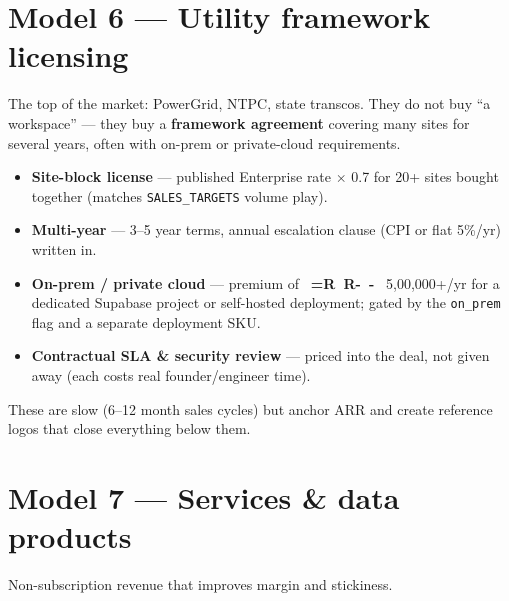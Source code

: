 \documentclass[11pt,a4paper]{article}
\newcommand{\Rs}{%
  \mbox{%
    \sffamily\bfseries
    \setbox0=\hbox{R}%
    R\kern-\wd0
    \raisebox{0.42em}{\rule{0.55em}{0.07em}}%
    \kern-\wd0
    \raisebox{0.25em}{\rule{0.55em}{0.07em}}%
    \kern\wd0
  }%
}
\newcommand{\flag}[1]{\texttt{#1}}
\begin{document}
\section{Model 6 --- Utility framework licensing}

The top of the market: PowerGrid, NTPC, state transcos. They do not buy
``a workspace'' --- they buy a \textbf{framework agreement} covering many sites for
several years, often with on-prem or private-cloud requirements.

\begin{itemize}[noitemsep, leftmargin=1.4em]
  \item \textbf{Site-block license} --- published Enterprise rate $\times$ 0.7 for
        20+ sites bought together (matches \texttt{SALES\_TARGETS} volume play).
  \item \textbf{Multi-year} --- 3--5 year terms, annual escalation clause (CPI or
        flat 5\%/yr) written in.
  \item \textbf{On-prem / private cloud} --- premium of \Rs 5{,}00{,}000+/yr for a
        dedicated Supabase project or self-hosted deployment; gated by the
        \flag{on\_prem} flag and a separate deployment SKU.
  \item \textbf{Contractual SLA \& security review} --- priced into the deal, not
        given away (each costs real founder/engineer time).
\end{itemize}

\noindent These are slow (6--12 month sales cycles) but anchor ARR and create
reference logos that close everything below them.

\section{Model 7 --- Services \& data products}

Non-subscription revenue that improves margin and stickiness.
\end{document}
